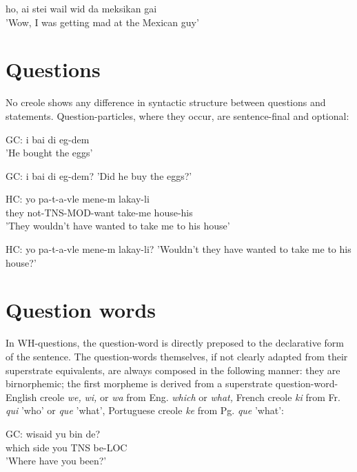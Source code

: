 \ea\label{ex:74}
 ho, ai stei wail wid da meksikan gai\\
\glt'Wow, I was getting mad at the Mexican guy'
\z




\section{Questions}


No creole shows any difference in syntactic structure between questions and statements. Question-particles, where they occur, are sentence-final and optional:

\ea\label{ex:75}
 GC: i bai di eg-dem\\
'He bought the eggs'
\z

\ea\label{ex:76}
 GC: i bai di eg-dem?
\glt'Did he buy the eggs?'
\z



\ea\label{ex:77}
\gll HC: yo pa-t-a-vle mene-m lakay-li\\
they not-TNS-MOD-want take-me house-his\\
\glt'They wouldn't have wanted to take me to his house'
\z





\ea\label{ex:78}
 HC: yo pa-t-a-vle mene-m lakay-li?
\glt'Wouldn't they have wanted to take me to his house?'
\z


\section{Question words}

In WH-questions, the question-word is directly preposed to the declarative form of the sentence. The question-words themselves, if not clearly adapted from their superstrate equivalents, are always composed in the following manner: they are birnorphemic; the first morpheme is derived from a superstrate question-word- English creole \textit{we,} \textit{wi,} or \textit{wa} from Eng. \textit{which} or \textit{what,} French creole \textit{ki} from Fr. \textit{qui} 'who' or \textit{que} 'what', Portuguese creole \textit{ke} from Pg. \textit{que} 'what':

\ea\label{ex:79}
 \gll GC: wisaid yu bin de?\\
which side you TNS be-LOC \\
\glt 'Where have you been?'
\z



